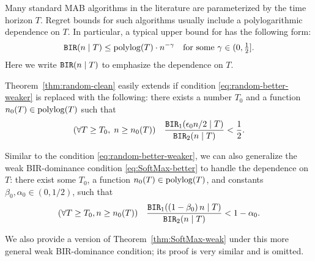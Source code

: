   Many standard MAB algorithms in the literature are parameterized by
  the time horizon $T$. Regret bounds for such algorithms usually
  include a polylogarithmic dependence on $T$. In particular, a
  typical upper bound for \BIR has the following form:
\begin{align}
    \BIR(n\mid T)\leq \polylog(T)\cdot n^{-\gamma}
    \quad \text{for some $\gamma\in(0,\tfrac12]$}.
\end{align}
Here we write $\mathtt{BIR}(n\mid T)$ to emphasize the dependence on $T$.

Theorem~\ref{thm:random-clean} easily extends if condition \eqref{eq:random-better-weaker} is replaced with the following:
there exists a number $T_0$ and a function $n_0(T)\in \polylog(T)$
such that
\begin{align}\label{eq:random-better-messy}
(\forall T\geq T_0,\; n\geq n_0(T)) \quad
\frac{\mathtt{BIR}_1(\epsilon_0 n /2\mid T)}{\mathtt{BIR}_2(n\mid T)} <\frac12.
\end{align}



Similar to the condition \eqref{eq:random-better-weaker}, we can also
generalize the weak BIR-dominance condition \eqref{eq:SoftMax-better}
to handle the dependence on $T$: there exist some $T_0$, a function
$n_0(T)\in \polylog(T)$, and constants $\beta_0,\alpha_0\in (0, 1/2)$, such that
\begin{align}\label{eq:SoftMax-better-weaker}
(\forall T\geq T_0,  n\geq n_0(T)) \quad
\frac{\mathtt{BIR}_1((1-\beta_0)\, n\mid T)}{\mathtt{BIR}_2(n\mid T)} <1-\alpha_0.
\end{align}

We also provide a version of Theorem~\ref{thm:SoftMax-weak} under this
more general weak BIR-dominance condition; its proof is very similar
and is omitted.
